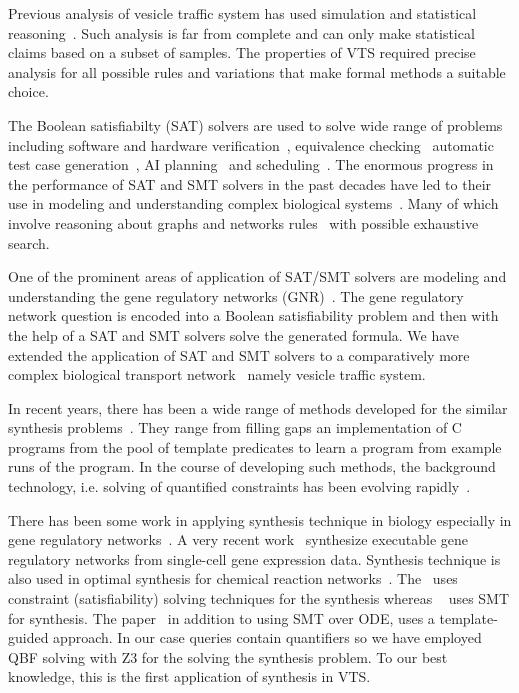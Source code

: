 Previous analysis of vesicle traffic system has used simulation and statistical reasoning~\cite{mani2016stacking}. 
%
Such analysis is far from complete and can only make statistical claims based on a subset of samples. 
%
The properties of VTS required precise analysis for all possible rules and variations that make formal methods a suitable choice.

The Boolean satisfiabilty (SAT) solvers are used to solve wide range of problems including
%
software and hardware verification~\cite{biere1999symbolic1, biere1999symbolic2, bjesse2001finding, velev2003effective}, equivalence checking~\cite{goldberg2001using} automatic test case generation~\cite{stephan1996combinational},
AI planning~\cite{kautz1996pushing} and scheduling~\cite{gomes1998randomization}. 
%
The enormous progress in the performance of SAT and SMT solvers
in the past decades have led to their use in modeling and understanding complex biological systems~\cite{heule2010exact,yordanov2013smt,mangla2010timing}. 
%
Many of which involve reasoning about graphs and networks rules~\cite{guerra2012reasoning,chin2008biographe} with possible exhaustive search.
%

One of the prominent areas of application of SAT/SMT solvers are modeling and understanding the gene regulatory networks (GNR)~\cite{giacobbe2015model,rosenblueth2014inference, batt2010efficient, yordanov2016method, dunn2014defining, paoletti2014analyzing, koksal2013synthesis}.
%
The gene regulatory network question is encoded into a Boolean satisfiability problem and then with the help of a SAT and SMT solvers solve the generated formula. 
% 
We have extended the application of SAT and SMT solvers to a comparatively more complex biological transport network~\cite{mani2016stacking} namely vesicle traffic system. 

In recent years, there has been a wide range of methods
developed for the similar synthesis problems~\cite{sketch,sygus,exampleSynth}.
%
They range from filling gaps an implementation of C programs from the pool of template predicates to learn a program from example
runs of the program.
%
In the course of developing such methods,
the background technology, i.e. solving of quantified
constraints has been evolving rapidly~\cite{lonsing2010depqbf,z3Quant}.
%

There has been some work in
applying synthesis technique in biology especially in gene regulatory networks~\cite{shavit2016automated, fisher2015synthesising}. A very recent work~\cite{fisher2015synthesising} synthesize executable gene regulatory networks from single-cell gene expression data.
Synthesis technique is also used in optimal synthesis for chemical reaction networks~\cite{cardelli2017syntax}. The~\cite{fisher2015synthesising} uses constraint (satisfiability) solving techniques for the synthesis whereas ~\cite{shavit2016automated} uses SMT for synthesis. The paper~\cite{cardelli2017syntax} in addition to using SMT over ODE, uses a template-guided approach. In our case queries contain quantifiers so we have employed QBF solving with Z3 for the solving the synthesis problem. To our best knowledge, this is the first application of synthesis in VTS.

~        
